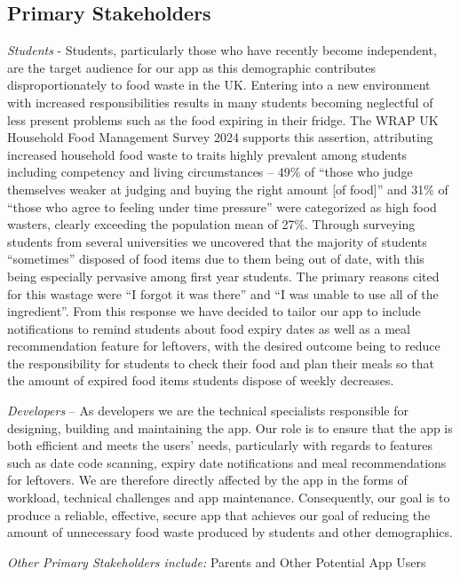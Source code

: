 \subsection{Primary Stakeholders}
    \indent\indent \textit{Students} - Students, particularly those who have recently become independent, are the target audience for our app as this demographic contributes disproportionately to food waste in the UK. Entering into a new environment with increased responsibilities results in many students becoming neglectful of less present problems such as the food expiring in their fridge. The WRAP UK Household Food Management Survey 2024\cite{waringPleaseUseThis} supports this assertion, attributing increased household food waste to traits highly prevalent among students\cite{gamboa-delgadoFactorsAssociatedFood2024, landryBarriersCollegeStudent2024} including competency and living circumstances – 49\% of “those who judge themselves weaker at judging and buying the right amount [of food]” and 31\% of “those who agree to feeling under time pressure” were categorized as high food wasters, clearly exceeding the population mean of 27\%. Through surveying students from several universities\cite{STUDENT SURVEY, FRESHER SURVEY} we uncovered that the majority of students “sometimes” disposed of food items due to them being out of date, with this being especially pervasive among first year students. The primary reasons cited for this wastage were “I forgot it was there” and “I was unable to use all of the ingredient”. From this response we have decided to tailor our app to include notifications to remind students about food expiry dates as well as a meal recommendation feature for leftovers, with the desired outcome being to reduce the responsibility for students to check their food and plan their meals so that the amount of expired food items students dispose of weekly decreases.\\
    \par
    \textit{Developers} – As developers we are the technical specialists responsible for designing, building and maintaining the app. Our role is to ensure that the app is both efficient and meets the users’ needs, particularly with regards to features such as date code scanning, expiry date notifications and meal recommendations for leftovers. We are therefore directly affected by the app in the forms of workload, technical challenges and app maintenance. Consequently, our goal is to produce a reliable, effective, secure app that achieves our goal of reducing the amount of unnecessary food waste produced by students and other demographics. \\
    \par
    \textit{Other Primary Stakeholders include:} Parents and Other Potential App Users
